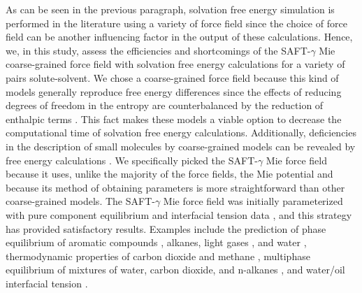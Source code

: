 \documentclass[final,12p,times,twocolumn]{elsarticle}
\begin{document}
	As can be seen in the previous paragraph, solvation free energy simulation is performed in the literature using a variety of force field since the choice of force field can be another influencing factor in the output of these calculations. Hence, we, in this study, assess the efficiencies and shortcomings of the SAFT-$\gamma$ Mie coarse-grained force field  \cite{avendano2011} with solvation free energy calculations for a variety of pairs solute-solvent. We chose a coarse-grained force field because this kind of models generally reproduce free energy differences since the effects of reducing degrees of freedom in the entropy are counterbalanced by the reduction of enthalpic terms \cite{kmiecik2016}. This fact makes these models a viable option to decrease the computational time of solvation free energy calculations. Additionally, deficiencies in the description of small molecules by coarse-grained models can be revealed by free energy calculations \cite{mobley2007,shirts2013}. We specifically picked the SAFT-$\gamma$ Mie force field because it uses, unlike the majority of the force fields, the Mie potential and because its method of obtaining parameters is more straightforward than other coarse-grained models. The SAFT-$\gamma$ Mie force field was initially parameterized with pure component equilibrium and interfacial tension data \cite{avendano2011}, and this strategy has provided satisfactory results. Examples include the prediction of phase equilibrium of aromatic compounds \cite{muller2017}, alkanes, light gases \cite{herdes2015}, and water \cite{lobanova2015}, thermodynamic properties of carbon dioxide and methane \cite{cassiano1}, multiphase equilibrium of mixtures of water, carbon dioxide, and n-alkanes \cite{lobanova2016}, and water/oil interfacial tension \cite{herdes2017}.
	
\end{document}
